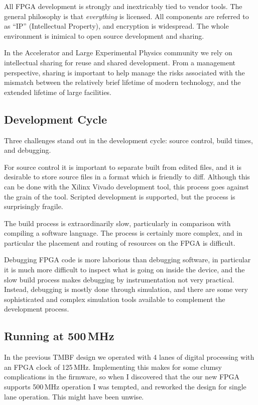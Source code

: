 \documentclass[
    a4paper,
    keeplastbox,            %
    hyphens,                %
    nospread,               %
]{jacow-2_1}
\begin{document}
All FPGA development is strongly and inextricably tied to vendor tools.  The
general philosophy is that \emph{everything} is licensed.  All components
are referred to as ``IP'' (Intellectual Property), and encryption is widespread.
The whole environment is inimical to open source development and sharing.

In the Accelerator and Large Experimental Physics community we rely on
intellectual sharing for reuse and shared development.  From a management
perspective, sharing is important to help manage the risks associated with the
mismatch between the relatively brief lifetime of modern technology, and the
extended lifetime of large facilities.


\subsection{Development Cycle}

Three challenges stand out in the development cycle: source control, build
times, and debugging.

For source control it is important to separate built from edited files, and it
is desirable to store source files in a format which is friendly to diff.
Although this can be done with the Xilinx Vivado development tool, this process
goes against the grain of the tool.  Scripted development is supported, but the
process is surprisingly fragile.

The build process is extraordinarily slow, particularly in comparison with
compiling a software language.  The process is certainly more complex, and in
particular the placement and routing of resources on the FPGA is difficult.

Debugging FPGA code is more laborious than debugging software, in particular it
is much more difficult to inspect what is going on inside the device, and the
slow build process makes debugging by instrumentation not very practical.
Instead, debugging is mostly done through simulation, and there are some very
sophisticated and complex simulation tools available to complement the
development process.


\subsection{Running at 500\,MHz}

In the previous TMBF design we operated with 4 lanes of digital processing with
an FPGA clock of 125\,MHz.  Implementing this makes for some clumsy
complications in the firmware, so when I discovered that the our new FPGA
supports 500\,MHz operation I was tempted, and reworked the design for single
lane operation.  This might have been unwise.
\end{document}

